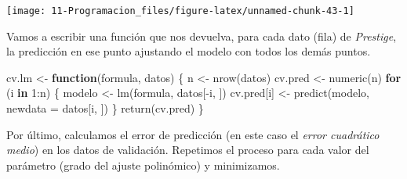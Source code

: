 \documentclass[
]{book}
\newenvironment{Shaded}{\begin{snugshade}}{\end{snugshade}}
\newcommand{\AttributeTok}[1]{\textcolor[rgb]{0.77,0.63,0.00}{#1}}
\newcommand{\ControlFlowTok}[1]{\textcolor[rgb]{0.13,0.29,0.53}{\textbf{#1}}}
\newcommand{\DecValTok}[1]{\textcolor[rgb]{0.00,0.00,0.81}{#1}}
\newcommand{\FunctionTok}[1]{\textcolor[rgb]{0.00,0.00,0.00}{#1}}
\newcommand{\NormalTok}[1]{#1}
\newcommand{\OtherTok}[1]{\textcolor[rgb]{0.56,0.35,0.01}{#1}}
\newcommand{\SpecialCharTok}[1]{\textcolor[rgb]{0.00,0.00,0.00}{#1}}
\theoremstyle{break}
\begin{document}
\begin{center}\texttt{[image: 11-Programacion\_files/figure-latex/unnamed-chunk-43-1]} \end{center}

Vamos a escribir una función que nos devuelva, para cada dato (fila) de
\emph{Prestige}, la predicción en ese punto ajustando el modelo con todos los demás puntos.

\begin{Shaded}
\begin{Highlighting}[]
\NormalTok{cv.lm }\OtherTok{\textless{}{-}} \ControlFlowTok{function}\NormalTok{(formula, datos) \{}
\NormalTok{      n }\OtherTok{\textless{}{-}} \FunctionTok{nrow}\NormalTok{(datos)}
\NormalTok{      cv.pred }\OtherTok{\textless{}{-}} \FunctionTok{numeric}\NormalTok{(n)}
      \ControlFlowTok{for}\NormalTok{ (i }\ControlFlowTok{in} \DecValTok{1}\SpecialCharTok{:}\NormalTok{n) \{}
\NormalTok{          modelo }\OtherTok{\textless{}{-}} \FunctionTok{lm}\NormalTok{(formula, datos[}\SpecialCharTok{{-}}\NormalTok{i, ])}
\NormalTok{          cv.pred[i] }\OtherTok{\textless{}{-}} \FunctionTok{predict}\NormalTok{(modelo, }\AttributeTok{newdata =}\NormalTok{ datos[i, ])}
\NormalTok{      \}}
      \FunctionTok{return}\NormalTok{(cv.pred)}
\NormalTok{\}}
\end{Highlighting}
\end{Shaded}

Por último, calculamos el error de predicción (en este caso el \emph{error cuadrático medio})
en los datos de validación. Repetimos el proceso para cada valor del parámetro (grado del
ajuste polinómico) y minimizamos.

\begin{Shaded}
\end{Shaded}
\end{document}
